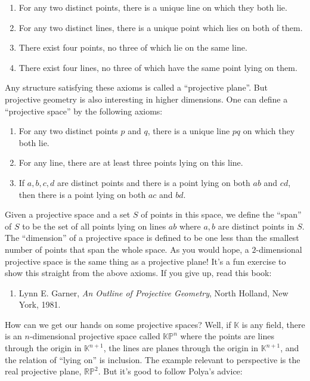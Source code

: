 \documentclass{article}
\def\tightlist{}
\begin{document}
\begin{enumerate}
\def\labelenumi{\Alph{enumi})}
\item
  For any two distinct points, there is a unique line on which they both
  lie.
\item
  For any two distinct lines, there is a unique point which lies on both
  of them.
\item
  There exist four points, no three of which lie on the same line.
\item
  There exist four lines, no three of which have the same point lying on
  them.
\end{enumerate}

Any structure satisfying these axioms is called a ``projective plane''.
But projective geometry is also interesting in higher dimensions. One
can define a ``projective space'' by the following axioms:

\begin{enumerate}
\def\labelenumi{\Alph{enumi})}
\item
  For any two distinct points \(p\) and \(q\), there is a unique line
  \(pq\) on which they both lie.
\item
  For any line, there are at least three points lying on this line.
\item
  If \(a,b,c,d\) are distinct points and there is a point lying on both
  \(ab\) and \(cd\), then there is a point lying on both \(ac\) and
  \(bd\).
\end{enumerate}

Given a projective space and a set \(S\) of points in this space, we
define the ``span'' of \(S\) to be the set of all points lying on lines
\(ab\) where \(a,b\) are distinct points in \(S\). The ``dimension'' of
a projective space is defined to be one less than the smallest number of
points that span the whole space. As you would hope, a \(2\)-dimensional
projective space is the same thing as a projective plane! It's a fun
exercise to show this straight from the above axioms. If you give up,
read this book:

\begin{enumerate}
\def\labelenumi{\arabic{enumi})}
\setcounter{enumi}{3}
\tightlist
\item
  Lynn E. Garner, \emph{An Outline of Projective Geometry}, North
  Holland, New York, 1981.
\end{enumerate}

How can we get our hands on some projective spaces? Well, if
\(\mathbb{K}\) is any field, there is an \(n\)-dimensional projective
space called \(\mathbb{KP}^n\) where the points are lines through the
origin in \(\mathbb{K}^{n+1}\), the lines are planes through the origin
in \(\mathbb{K}^{n+1}\), and the relation of ``lying on'' is inclusion.
The example relevant to perspective is the real projective plane,
\(\mathbb{RP}^2\). But it's good to follow Polya's advice:
\end{document}
